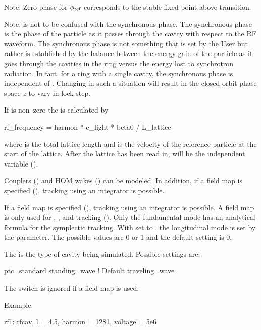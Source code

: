 {Note: Zero phase for $\phi_{\text{ref}}$ corresponds to the stable fixed point above transition.

Note:  is not to be confused with the synchronous phase. The synchronous phase is the phase
of the particle as it passes through the cavity with respect to the RF waveform. The synchronous
phase is not something that is set by the User but rather is established by the balance between the
energy gain of the particle as it goes through the cavities in the ring versus the energy lost to
synchrotron radiation. In fact, for a ring with a single cavity, the synchronous phase is independent
of . Changing  in such a situation will result in the closed orbit phase space $z$ to
vary in lock step.

If  is non--zero the  is calculated by
\begin{example}
  rf_frequency = harmon * c_light * beta0 / L_lattice 
\end{example}
where  is the total lattice length and  is the
velocity of the reference particle at the start of the lattice. After
the lattice has been read in,  will be the
independent variable ().

Couplers () and HOM wakes () can
be modeled. In addition, if a field map is specified
(), tracking using an integrator is possible.

If a field map is specified (), tracking using an integrator is possible. A field
map is only used for , , and  tracking
(). Only the fundamental mode has an analytical formula for the symplectic
tracking. With  set to , the longitudinal mode is set by the
 parameter. The possible values are 0 or 1 and the default setting is 0.

The  is the type of cavity being simulated. Possible
settings are:
\begin{example}
  ptc_standard
  standing_wave    ! Default
  traveling_wave
\end{example}
The  switch is ignored if a field map is used.

Example:
\begin{example}
  rf1: rfcav, l = 4.5, harmon = 1281, voltage = 5e6
\end{example}

}
